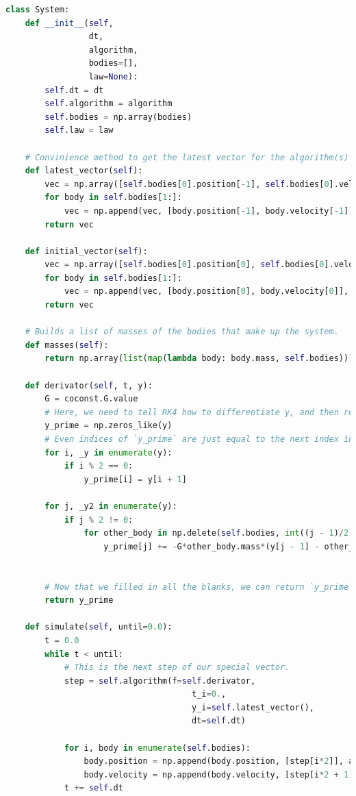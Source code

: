 \documentclass[11pt]{article}
\begin{document}
    \begin{lstlisting}[language=Python, caption=System]
class System:
    def __init__(self,
                 dt,
                 algorithm,
                 bodies=[],
                 law=None):
        self.dt = dt
        self.algorithm = algorithm
        self.bodies = np.array(bodies)
        self.law = law

    # Convinience method to get the latest vector for the algorithm(s) to use.
    def latest_vector(self):
        vec = np.array([self.bodies[0].position[-1], self.bodies[0].velocity[-1]])
        for body in self.bodies[1:]:
            vec = np.append(vec, [body.position[-1], body.velocity[-1]], axis=0)
        return vec

    def initial_vector(self):
        vec = np.array([self.bodies[0].position[0], self.bodies[0].velocity[0]])
        for body in self.bodies[1:]:
            vec = np.append(vec, [body.position[0], body.velocity[0]], axis=0)
        return vec

    # Builds a list of masses of the bodies that make up the system.
    def masses(self):
        return np.array(list(map(lambda body: body.mass, self.bodies)))

    def derivator(self, t, y):
        G = coconst.G.value
        # Here, we need to tell RK4 how to differentiate y, and then return it.
        y_prime = np.zeros_like(y)
        # Even indices of `y_prime` are just equal to the next index in y.
        for i, _y in enumerate(y):
            if i % 2 == 0:
                y_prime[i] = y[i + 1]

        for j, _y2 in enumerate(y):
            if j % 2 != 0:
                for other_body in np.delete(self.bodies, int((j - 1)/2)):
                    y_prime[j] += -G*other_body.mass*(y[j - 1] - other_body.position[-1])/(np.linalg.norm(y[j - 1] - other_body.position[-1]))**3


        # Now that we filled in all the blanks, we can return `y_prime`.
        return y_prime

    def simulate(self, until=0.0):
        t = 0.0
        while t < until:
            # This is the next step of our special vector.
            step = self.algorithm(f=self.derivator,
                                      t_i=0.,
                                      y_i=self.latest_vector(),
                                      dt=self.dt)

            for i, body in enumerate(self.bodies):
                body.position = np.append(body.position, [step[i*2]], axis=0)
                body.velocity = np.append(body.velocity, [step[i*2 + 1]], axis=0)
            t += self.dt
    \end{lstlisting}
\end{document}
